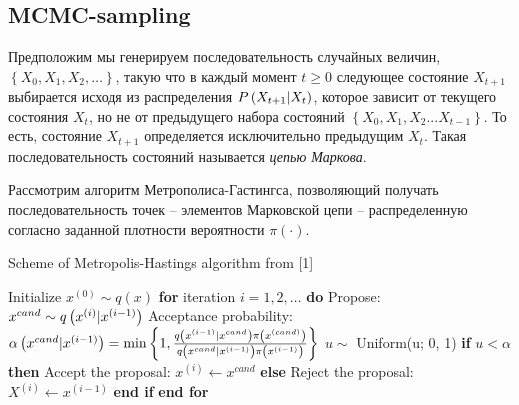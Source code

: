 \subsection{MCMC-sampling}

Предположим мы генерируем последовательность случайных величин, $\left\{ X_0, X_1, X_2, \dots \right\}$, такую что в каждый момент $t \geq 0$ следующее состояние $X_{t + 1}$ выбирается исходя из распределения $P \left( X_{t+1} | X_t \right)$, которое зависит от текущего состояния $X_t$, но не от предыдущего набора состояний $\left\{ X_0, X_1, X_2 ... X_{t - 1} \right\}$. То есть, состояние $X_{t + 1}$ определяется исключительно предыдущим $X_t$. Такая последовательность состояний называется \textit{цепью Маркова}. \par
Рассмотрим алгоритм Метрополиса-Гастингса, позволяющий получать последовательность точек -- элементов Марковской цепи -- распределенную согласно заданной плотности вероятности $\pi(\cdot)$.
\begin{algorithm}
\begin{algorithmic}[2]
		\caption{Scheme of Metropolis-Hastings algorithm from [1]}\label{metropolis}
\State Initialize $x^{(0)} \sim q(x)$
\State \textbf{for} iteration $i = 1, 2, \dots$ \textbf{do}
\State \quad Propose: $x^{cand} \sim q \left( x^{(i)} | x^{(i-1)} \right)$
\State \quad Acceptance probability:
\State \qquad $\alpha \left( x^{cand} | x^{(i-1)} \right) = \min \left\{ 1, \frac{q \left( x^{(i-1)} | x^{cand} \right) \pi \left( x^{(cand)} \right) }{ q \left( x^{cand} | x^{(i-1)} \right) \pi \left( x^{(i-1)} \right)} \right\}$
\State \quad $u \sim$ Uniform(u; 0, 1)
\State \quad \textbf{if} $u < \alpha$ \textbf{then}
\State \qquad Accept the proposal: $x^{(i)} \gets x^{cand}$
\State \quad \textbf{else}
\State \qquad Reject the proposal: $X^{(i)} \gets x^{(i-1)}$
\State \quad \textbf{end if}
\State \textbf{end for}
\end{algorithmic}
\end{algorithm}

